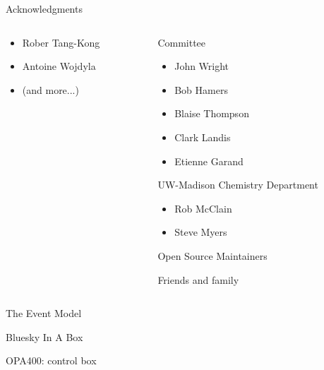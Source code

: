 \documentclass{presentation}
\begin{document}
\begin{frame}{Acknowledgments}
\begin{columns}
\begin{column}{0.33\textwidth}
\begin{itemize}
		    \item Rober Tang-Kong
		    \item Antoine Wojdyla
		    \item (and more...)
	    \end{itemize}
    \end{column}
    \begin{column}{0.33\textwidth}
      Committee
      \begin{itemize}
        \item John Wright
        \item Bob Hamers
        \item Blaise Thompson
        \item Clark Landis
	\item Etienne Garand
      \end{itemize}
	    \vspace{10pt}

      UW-Madison Chemistry Department
      \begin{itemize}
        \item Rob McClain
        \item Steve Myers
      \end{itemize}

	    \vspace{10pt}
      Open Source Maintainers

	    \vspace{10pt}
      Friends and family 

    \end{column}
  \end{columns}
\end{frame}


\begin{frame}{The Event Model}
\end{frame}

\begin{frame}{Bluesky In A Box}
\end{frame}

\begin{frame}{OPA400: control box}
\end{frame}
\end{document}
